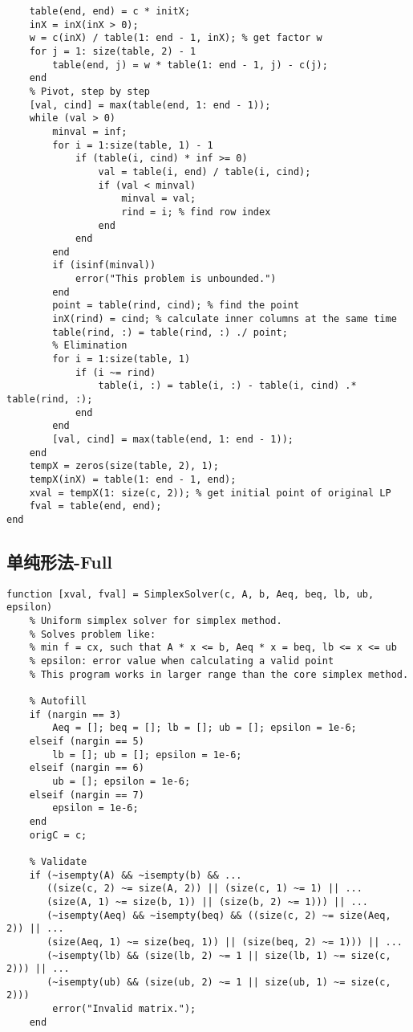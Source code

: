 \documentclass[bwprint, withouttitlepage]{mathexpthesis}
\begin{document}
\begin{appendices}
\begin{verbatim}
    table(end, end) = c * initX;
    inX = inX(inX > 0);
    w = c(inX) / table(1: end - 1, inX); % get factor w
    for j = 1: size(table, 2) - 1
        table(end, j) = w * table(1: end - 1, j) - c(j);
    end
    % Pivot, step by step
    [val, cind] = max(table(end, 1: end - 1));
    while (val > 0)
        minval = inf;
        for i = 1:size(table, 1) - 1
            if (table(i, cind) * inf >= 0)
                val = table(i, end) / table(i, cind);
                if (val < minval)
                    minval = val;
                    rind = i; % find row index
                end
            end
        end
        if (isinf(minval))
            error("This problem is unbounded.")
        end
        point = table(rind, cind); % find the point
        inX(rind) = cind; % calculate inner columns at the same time
        table(rind, :) = table(rind, :) ./ point;
        % Elimination
        for i = 1:size(table, 1)
            if (i ~= rind)
                table(i, :) = table(i, :) - table(i, cind) .* table(rind, :); 
            end
        end
        [val, cind] = max(table(end, 1: end - 1));
    end
    tempX = zeros(size(table, 2), 1);
    tempX(inX) = table(1: end - 1, end);
    xval = tempX(1: size(c, 2)); % get initial point of original LP
    fval = table(end, end);
end
\end{verbatim}
\subsection{单纯形法-Full}
\begin{verbatim}
function [xval, fval] = SimplexSolver(c, A, b, Aeq, beq, lb, ub, epsilon)
    % Uniform simplex solver for simplex method.
    % Solves problem like:
    % min f = cx, such that A * x <= b, Aeq * x = beq, lb <= x <= ub
    % epsilon: error value when calculating a valid point
    % This program works in larger range than the core simplex method.

    % Autofill
    if (nargin == 3)
        Aeq = []; beq = []; lb = []; ub = []; epsilon = 1e-6;
    elseif (nargin == 5)
        lb = []; ub = []; epsilon = 1e-6;
    elseif (nargin == 6)
        ub = []; epsilon = 1e-6;
    elseif (nargin == 7)
        epsilon = 1e-6;
    end
    origC = c;
    
    % Validate
    if (~isempty(A) && ~isempty(b) && ... 
       ((size(c, 2) ~= size(A, 2)) || (size(c, 1) ~= 1) || ...
       (size(A, 1) ~= size(b, 1)) || (size(b, 2) ~= 1))) || ...
       (~isempty(Aeq) && ~isempty(beq) && ((size(c, 2) ~= size(Aeq, 2)) || ...
       (size(Aeq, 1) ~= size(beq, 1)) || (size(beq, 2) ~= 1))) || ...
       (~isempty(lb) && (size(lb, 2) ~= 1 || size(lb, 1) ~= size(c, 2))) || ...
       (~isempty(ub) && (size(ub, 2) ~= 1 || size(ub, 1) ~= size(c, 2)))
        error("Invalid matrix.");
    end
    

\end{verbatim}
\end{appendices}
\end{document}
